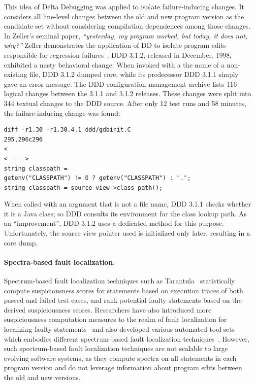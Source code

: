 This idea of Delta Debugging was applied to isolate failure-inducing changes. It considers all line-level changes between the old and new program version as the candidate set without considering compilation dependences among those changes. In Zeller's seminal paper, {\em ``yesterday, my program worked, but today, it does not, why?''} Zeller demonstrates the application of DD to isolate program edits responsible for regression failures~\cite{Zeller1999}. DDD 3.1.2, released in December, 1998, exhibited a nasty behavioral change: When invoked with a the name of a non-existing file, DDD 3.1.2 dumped core, while its predecessor DDD 3.1.1 simply gave an error message. The DDD configuration management archive lists 116 logical changes between the 3.1.1 and 3.1.2 releases. These changes were split into 344 textual changes to the DDD source. After only 12 test runs and 58 minutes, the failure-inducing change was found: 
\begin{verbatim}
diff -r1.30 -r1.30.4.1 ddd/gdbinit.C 
295,296c296
<
< --- >
string classpath =
getenv("CLASSPATH") != 0 ? getenv("CLASSPATH") : ".";
string classpath = source view->class path();
\end{verbatim} 

When called with an argument that is not a file name, DDD 3.1.1 checks whether it is a Java class; so DDD consults its environment for the class lookup path. As an ``improvement'', DDD 3.1.2 uses a dedicated method for this purpose. Unfortunately, the source view pointer used is initialized only later, resulting in a core dump. 


\paragraph{Spectra-based fault localization.} Spectrum-based fault localization techniques such as Tarantula~\cite{Jones2002:tarantula} statistically compute suspiciousness scores for statements based on execution traces of both passed and failed test cases, and rank potential faulty statements based on the derived suspiciousness scores. Researchers have also introduced more suspiciousness computation measures to the realm of fault localization for localizing faulty statements~\cite{naish2011model, lo2010comprehensive} and also developed various automated tool-sets which embodies different spectrum-based fault localization techniques~\cite{tarantula-url, janssen2009zoltar}. However, such spectrum-based fault localization techniques are not scalable to large evolving software systems, as they compute spectra on all statements in each program version and do not leverage information about program edits between the old and new versions.

